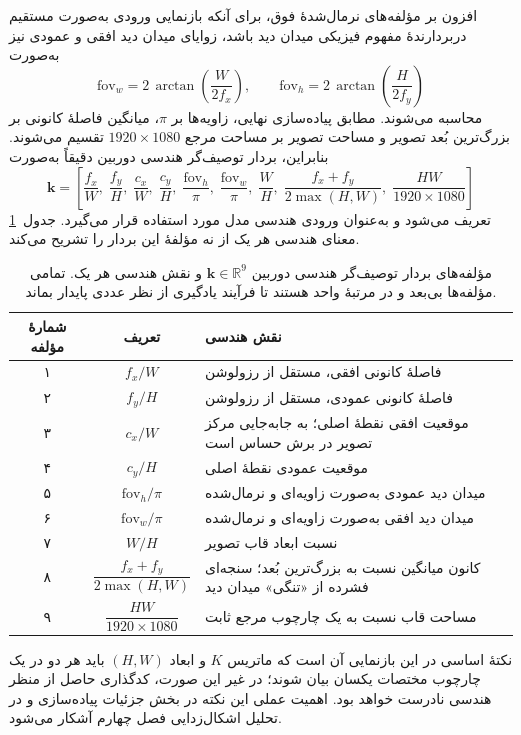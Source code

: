 افزون بر مؤلفه‌های نرمال‌شدهٔ فوق، برای آنکه بازنمایی ورودی به‌صورت مستقیم دربردارندهٔ مفهوم فیزیکی میدان دید باشد، زوایای میدان دید افقی و عمودی نیز به‌صورت
\begin{equation}
\mathrm{fov}_w = 2\,\arctan\!\left(\frac{W}{2 f_x}\right), \qquad
\mathrm{fov}_h = 2\,\arctan\!\left(\frac{H}{2 f_y}\right)
\end{equation}
محاسبه می‌شوند. مطابق پیاده‌سازی نهایی، زاویه‌ها بر $\pi$، میانگین فاصلهٔ کانونی بر بزرگ‌ترین بُعد تصویر و مساحت تصویر بر مساحت مرجع $1920\times1080$ تقسیم می‌شوند. بنابراین، بردار توصیف‌گر هندسی دوربین دقیقاً به‌صورت
\begin{equation}
\mathbf{k} = \left[\frac{f_x}{W},\;\frac{f_y}{H},\;\frac{c_x}{W},\;\frac{c_y}{H},\;
\frac{\mathrm{fov}_h}{\pi},\;\frac{\mathrm{fov}_w}{\pi},\;\frac{W}{H},\;
\frac{f_x+f_y}{2\max(H,W)},\;\frac{HW}{1920\times1080}\right]
\end{equation}
تعریف می‌شود و به‌عنوان ورودی هندسی مدل مورد استفاده قرار می‌گیرد.
جدول~\ref{tab:camera_descriptor} معنای هندسی هر یک از نه مؤلفهٔ این بردار را
تشریح می‌کند.

\begin{table}[htbp]
\centering
\caption[مؤلفه‌های بردار توصیف‌گر هندسی دوربین]{مؤلفه‌های بردار توصیف‌گر
هندسی دوربین $\mathbf{k}\in\mathbb{R}^{9}$ و نقش هندسی هر یک. تمامی مؤلفه‌ها
بی‌بعد و در مرتبهٔ واحد هستند تا فرآیند یادگیری از نظر عددی پایدار بماند.}
\label{tab:camera_descriptor}
\small
\renewcommand{\arraystretch}{1.35}
\begin{tabularx}{\textwidth}{@{}c c >{\raggedleft\arraybackslash}X@{}}
\toprule
شمارهٔ مؤلفه & تعریف & نقش هندسی \\ \midrule
۱ & $f_x/W$ & فاصلهٔ کانونی افقی، مستقل از رزولوشن \\
۲ & $f_y/H$ & فاصلهٔ کانونی عمودی، مستقل از رزولوشن \\
۳ & $c_x/W$ & موقعیت افقی نقطهٔ اصلی؛ به جابه‌جایی مرکز تصویر در برش حساس است \\
۴ & $c_y/H$ & موقعیت عمودی نقطهٔ اصلی \\
۵ & $\mathrm{fov}_h/\pi$ & میدان دید عمودی به‌صورت زاویه‌ای و نرمال‌شده \\
۶ & $\mathrm{fov}_w/\pi$ & میدان دید افقی به‌صورت زاویه‌ای و نرمال‌شده \\
۷ & $W/H$ & نسبت ابعاد قاب تصویر \\
۸ & $\dfrac{f_x+f_y}{2\max(H,W)}$ & کانون میانگین نسبت به بزرگ‌ترین بُعد؛ سنجه‌ای فشرده از «تنگی» میدان دید \\
۹ & $\dfrac{HW}{1920\times1080}$ & مساحت قاب نسبت به یک چارچوب مرجع ثابت \\
\bottomrule
\end{tabularx}
\end{table}
 نکتهٔ اساسی در این بازنمایی آن است که ماتریس $K$ و ابعاد $(H, W)$ باید هر دو در یک چارچوب مختصات یکسان بیان شوند؛ در غیر این صورت، کدگذاری حاصل از منظر هندسی نادرست خواهد بود. اهمیت عملی این نکته در بخش جزئیات پیاده‌سازی و در تحلیل اشکال‌زدایی فصل چهارم آشکار می‌شود.


